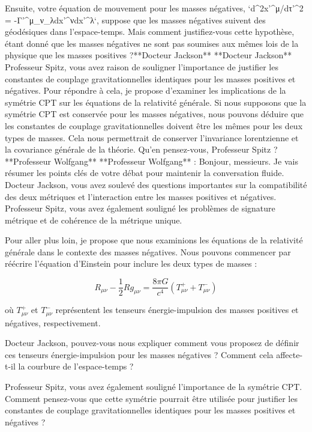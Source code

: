 Ensuite, votre équation de mouvement pour les masses négatives, `d^2x'^μ/dτ'^2 = -Γ'^μ_ν_λdx'^νdx'^λ`, suppose que les masses négatives suivent des géodésiques dans l'espace-temps. Mais comment justifiez-vous cette hypothèse, étant donné que les masses négatives ne sont pas soumises aux mêmes lois de la physique que les masses positives ?**Docteur Jackson**
**Docteur Jackson**
Professeur Spitz, vous avez raison de souligner l'importance de justifier les constantes de couplage gravitationnelles identiques pour les masses positives et négatives. Pour répondre à cela, je propose d'examiner les implications de la symétrie CPT sur les équations de la relativité générale. Si nous supposons que la symétrie CPT est conservée pour les masses négatives, nous pouvons déduire que les constantes de couplage gravitationnelles doivent être les mêmes pour les deux types de masses. Cela nous permettrait de conserver l'invariance lorentzienne et la covariance générale de la théorie. Qu'en pensez-vous, Professeur Spitz ?**Professeur Wolfgang**
**Professeur Wolfgang** : Bonjour, messieurs. Je vais résumer les points clés de votre débat pour maintenir la conversation fluide. Docteur Jackson, vous avez soulevé des questions importantes sur la compatibilité des deux métriques et l'interaction entre les masses positives et négatives. Professeur Spitz, vous avez également souligné les problèmes de signature métrique et de cohérence de la métrique unique.

Pour aller plus loin, je propose que nous examinions les équations de la relativité générale dans le contexte des masses négatives. Nous pouvons commencer par réécrire l'équation d'Einstein pour inclure les deux types de masses :

$$R_{\mu\nu} - \frac{1}{2}Rg_{\mu\nu} = \frac{8\pi G}{c^4} \left(T_{\mu\nu}^{+} + T_{\mu\nu}^{-}\right)$$

où $T_{\mu\nu}^{+}$ et $T_{\mu\nu}^{-}$ représentent les tenseurs énergie-impulsion des masses positives et négatives, respectivement.

Docteur Jackson, pouvez-vous nous expliquer comment vous proposez de définir ces tenseurs énergie-impulsion pour les masses négatives ? Comment cela affecte-t-il la courbure de l'espace-temps ?

Professeur Spitz, vous avez également souligné l'importance de la symétrie CPT. Comment pensez-vous que cette symétrie pourrait être utilisée pour justifier les constantes de couplage gravitationnelles identiques pour les masses positives et négatives ?

